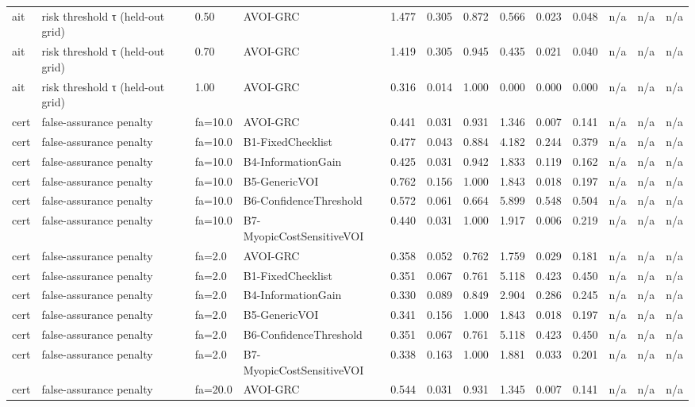 \begin{table}[!ht]
{\begin{tabular}{lllllllllllll}
ait & risk threshold τ (held-out grid) & 0.50 & AVOI-GRC & 1.477 & 0.305 & 0.872 & 0.566 & 0.023 & 0.048 & n/a & n/a & n/a \\
ait & risk threshold τ (held-out grid) & 0.70 & AVOI-GRC & 1.419 & 0.305 & 0.945 & 0.435 & 0.021 & 0.040 & n/a & n/a & n/a \\
ait & risk threshold τ (held-out grid) & 1.00 & AVOI-GRC & 0.316 & 0.014 & 1.000 & 0.000 & 0.000 & 0.000 & n/a & n/a & n/a \\
cert & false-assurance penalty & fa=10.0 & AVOI-GRC & 0.441 & 0.031 & 0.931 & 1.346 & 0.007 & 0.141 & n/a & n/a & n/a \\
cert & false-assurance penalty & fa=10.0 & B1-FixedChecklist & 0.477 & 0.043 & 0.884 & 4.182 & 0.244 & 0.379 & n/a & n/a & n/a \\
cert & false-assurance penalty & fa=10.0 & B4-InformationGain & 0.425 & 0.031 & 0.942 & 1.833 & 0.119 & 0.162 & n/a & n/a & n/a \\
cert & false-assurance penalty & fa=10.0 & B5-GenericVOI & 0.762 & 0.156 & 1.000 & 1.843 & 0.018 & 0.197 & n/a & n/a & n/a \\
cert & false-assurance penalty & fa=10.0 & B6-ConfidenceThreshold & 0.572 & 0.061 & 0.664 & 5.899 & 0.548 & 0.504 & n/a & n/a & n/a \\
cert & false-assurance penalty & fa=10.0 & B7-MyopicCostSensitiveVOI & 0.440 & 0.031 & 1.000 & 1.917 & 0.006 & 0.219 & n/a & n/a & n/a \\
cert & false-assurance penalty & fa=2.0 & AVOI-GRC & 0.358 & 0.052 & 0.762 & 1.759 & 0.029 & 0.181 & n/a & n/a & n/a \\
cert & false-assurance penalty & fa=2.0 & B1-FixedChecklist & 0.351 & 0.067 & 0.761 & 5.118 & 0.423 & 0.450 & n/a & n/a & n/a \\
cert & false-assurance penalty & fa=2.0 & B4-InformationGain & 0.330 & 0.089 & 0.849 & 2.904 & 0.286 & 0.245 & n/a & n/a & n/a \\
cert & false-assurance penalty & fa=2.0 & B5-GenericVOI & 0.341 & 0.156 & 1.000 & 1.843 & 0.018 & 0.197 & n/a & n/a & n/a \\
cert & false-assurance penalty & fa=2.0 & B6-ConfidenceThreshold & 0.351 & 0.067 & 0.761 & 5.118 & 0.423 & 0.450 & n/a & n/a & n/a \\
cert & false-assurance penalty & fa=2.0 & B7-MyopicCostSensitiveVOI & 0.338 & 0.163 & 1.000 & 1.881 & 0.033 & 0.201 & n/a & n/a & n/a \\
cert & false-assurance penalty & fa=20.0 & AVOI-GRC & 0.544 & 0.031 & 0.931 & 1.345 & 0.007 & 0.141 & n/a & n/a & n/a \\

\end{tabular}}
\end{table}
